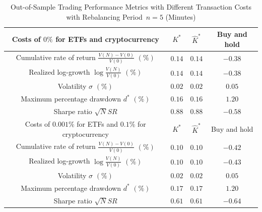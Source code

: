 \documentclass[10pt]{article} %
\begin{document}
	
	\medskip
	\begin{table}[h!] 
		\centering
		\caption{Out-of-Sample Trading Performance Metrics with Different Transaction Costs with Rebalancing Period~$n=5$ (Minutes)} 
		\begin{tabular}{|c|c|c|c|}
			\hline 
			Costs of $0\%$ for ETFs and cryptocurrency & $K^*$ & $\widehat{K}^*$ & Buy and hold \\
			\hline
			Cumulative rate of return $\frac{V(N)-V(0)}{V(0)}$ $(\%)$ & $0.14$ & $0.14$ & $-0.38$  \\
			\hline
			Realized log-growth $\log\frac{V(N)}{V(0)}$ $(\%)$ & $0.14$ & $0.14$ & $-0.38$ \\
			\hline
			Volatility $\sigma$ $(\%)$ & $0.02$ & $0.02$ & $0.05$ \\
			\hline
			Maximum percentage drawdown $d^*$ $(\%)$ & $0.16$ & $0.16$ & $1.20$\\
			\hline
			Sharpe ratio $\sqrt{N}SR$ &  $0.88$ &  $0.88$ &  $-0.58$ \\
			\hline
			\hline
			\hline
			Costs of $0.001\%$ for ETFs and $0.1\%$ for cryptocurrency & $K^*$ & $\widehat{K}^*$ & Buy and hold \\
			\hline
			Cumulative rate of return $\frac{V(N)-V(0)}{V(0)}$ $(\%)$ & $0.10$ & $0.10$ & $-0.42$  \\
			\hline
			Realized log-growth $\log\frac{V(N)}{V(0)}$ $(\%)$ & $0.10$ & $0.10$ & $-0.43$\\
			\hline
			Volatility $\sigma$ $(\%)$ & $0.02$ & $0.02$ & $0.05$\\
			\hline
			Maximum percentage drawdown $d^*$ $(\%)$ & $0.17$ & $0.17$ & $1.20$\\
			\hline
			Sharpe ratio $\sqrt{N}SR$ &  $0.61$ &  $0.61$ &  $-0.64$ \\
			\hline
			\hline
		\end{tabular}
		\label{table: Descriptive Statistics_n=5}
	\end{table}
	
\end{document}
